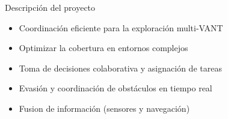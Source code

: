 \documentclass[
	12pt, %
	aspectratio=169, %
]{beamer}
\begin{document}
\begin{frame}{Descripción del proyecto}
  \begin{minipage}{0.47\textwidth}
    \begin{itemize}
    \item<1-> Coordinación eficiente para la exploración multi-VANT 
    \item<2-> Optimizar la cobertura en entornos complejos
    \item<3-> Toma de decisiones colaborativa y asignación de tareas
    \item<4-> Evasión y coordinación de obstáculos en tiempo real
    \item<5-> Fusion de información (sensores y navegación)
    \end{itemize}
  \end{minipage}
  \begin{minipage}{0.5\textwidth}

\end{minipage}
\end{frame}
\end{document}
